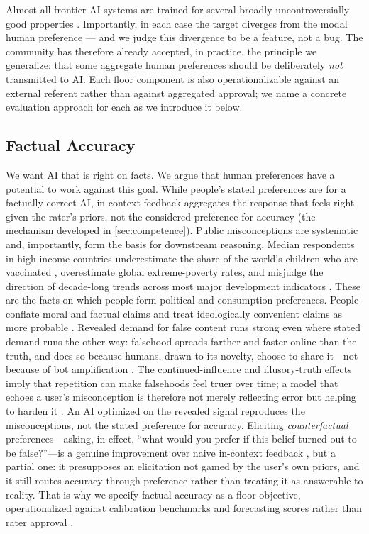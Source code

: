 \documentclass{article}
\theoremstyle{plain}
\theoremstyle{definition}
\theoremstyle{remark}
\begin{document}
Almost all frontier AI systems are trained for several broadly uncontroversially good properties \citep{askell2021general, bai2022constitutional}. Importantly, in each case the target diverges from the modal human preference --- and we judge this divergence to be a feature, not a bug. The community has therefore already accepted, in practice, the principle we generalize: that some aggregate human preferences should be deliberately \emph{not} transmitted to AI. Each floor component is also operationalizable against an external referent rather than against aggregated approval; we name a concrete evaluation approach for each as we introduce it below.

\subsection{Factual Accuracy}
We want AI that is right on facts. We argue that human preferences have a potential to work against this goal. While people's stated preferences are for a factually correct AI, in-context feedback aggregates the response that feels right given the rater's priors, not the considered preference for accuracy (the mechanism developed in \cref{sec:competence}). Public misconceptions are systematic and, importantly, form the basis for downstream reasoning. Median respondents in high-income countries underestimate the share of the world's children who are vaccinated \citep{gapminder-ignorance}, overestimate global extreme-poverty rates, and misjudge the direction of decade-long trends across most major development indicators \citep{sdg-misconceptions}. These are the facts on which people form political and consumption preferences. People conflate moral and factual claims \citep{liu2013dilemma, Goodwin2008ThePO} and treat ideologically convenient claims as more probable \citep{lewandowsky2012misinformation}. Revealed demand for false content runs strong even where stated demand runs the other way: falsehood spreads farther and faster online than the truth, and does so because humans, drawn to its novelty, choose to share it---not because of bot amplification \citep{vosoughi2018spread}. The continued-influence and illusory-truth effects imply that repetition can make falsehoods feel truer over time; a model that echoes a user's misconception is therefore not merely reflecting error but helping to harden it \citep{lewandowsky2012misinformation}. An AI optimized on the revealed signal reproduces the misconceptions, not the stated preference for accuracy. Eliciting \emph{counterfactual} preferences---asking, in effect, ``what would you prefer if this belief turned out to be false?''---is a genuine improvement over naive in-context feedback \citep{zhixuan2025beyond}, but a partial one: it presupposes an elicitation not gamed by the user's own priors, and it still routes accuracy through preference rather than treating it as answerable to reality. That is why we specify factual accuracy as a floor objective, operationalized against calibration benchmarks and forecasting scores rather than rater approval \citep{gneiting2007strictly}.
\end{document}
